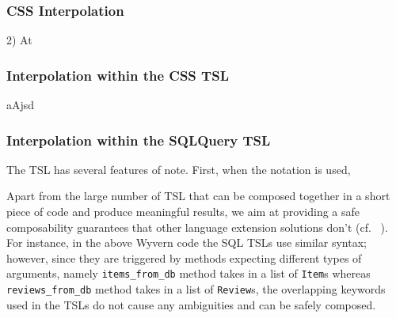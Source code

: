 \subsubsection{CSS Interpolation} 2) At

\subsubsection{Interpolation within the CSS TSL} aAjsd

\subsubsection{Interpolation within the SQLQuery TSL}

The  TSL has several features of note. First, when the  notation is used, 


Apart from the large number of TSL that can be composed together in a short piece of code and produce meaningful results, we aim at providing a safe composability guarantees that other language extension solutions don't (cf.~\cite{Erdweg:2013:FEL:2517208.2517210} ). For instance, in the above Wyvern code the SQL TSLs use similar syntax; however, since they are triggered by methods expecting different types of arguments, namely \lstinline{items_from_db} method takes in a list of \lstinline{Item}s whereas \lstinline{reviews_from_db} method takes in a list of \lstinline{Review}s, the overlapping keywords used in the TSLs do not cause any ambiguities and can be safely composed.

